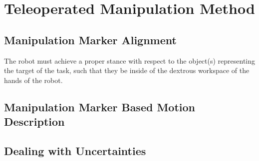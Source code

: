 \section{Teleoperated Manipulation Method}
	\label{sec:teleop_manip_method}

	\subsection{Manipulation Marker Alignment}
	
	The robot must achieve a proper stance with respect to the object(s) representing the target of the task,
	such that they be inside of the dextrous workspace of the hands of the robot.
	
	\subsection{Manipulation Marker Based Motion Description}
	
	\subsection{Dealing with Uncertainties}